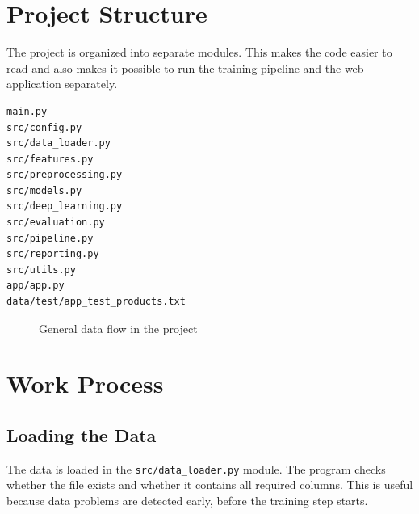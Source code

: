 \documentclass[12pt,a4paper]{article}
\begin{document}
\section{Project Structure}

The project is organized into separate modules. This makes the code easier to read and also makes it possible to run the training pipeline and the web application separately.

\begin{lstlisting}[language=bash, caption={Main project files}]
main.py
src/config.py
src/data_loader.py
src/features.py
src/preprocessing.py
src/models.py
src/deep_learning.py
src/evaluation.py
src/pipeline.py
src/reporting.py
src/utils.py
app/app.py
data/test/app_test_products.txt
\end{lstlisting}

\begin{figure}[H]
\centering
{}
\caption{General data flow in the project}
\label{fig:pipeline}
\end{figure}

\section{Work Process}

\subsection{Loading the Data}

The data is loaded in the \texttt{src/data\_loader.py} module. The program checks whether the file exists and whether it contains all required columns. This is useful because data problems are detected early, before the training step starts.
\end{document}
